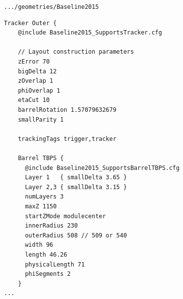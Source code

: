 \documentclass[pdftex, 11pt]{beamer}
\newcommand{\pat}[1]{\texttt{#1}}
\newcommand{\tkl}{TkLayout}
\begin{document}


\begin{frame}[fragile]
  \tiny
  \begin{block}{\pat{.../geometries/Baseline2015}}
\begin{verbatim}
Tracker Outer {
    @include Baseline2015_SupportsTracker.cfg

    // Layout construction parameters
    zError 70
    bigDelta 12
    zOverlap 1
    phiOverlap 1
    etaCut 10
    barrelRotation 1.57079632679
    smallParity 1

    trackingTags trigger,tracker

    Barrel TBPS {
      @include Baseline2015_SupportsBarrelTBPS.cfg
      Layer 1   { smallDelta 3.65 }
      Layer 2,3 { smallDelta 3.15 }
      numLayers 3
      maxZ 1150
      startZMode modulecenter
      innerRadius 230
      outerRadius 508 // 509 or 540
      width 96
      length 46.26
      physicalLength 71
      phiSegments 2
    }
...
\end{verbatim}
  \end{block}
\end{frame}
\end{document}
